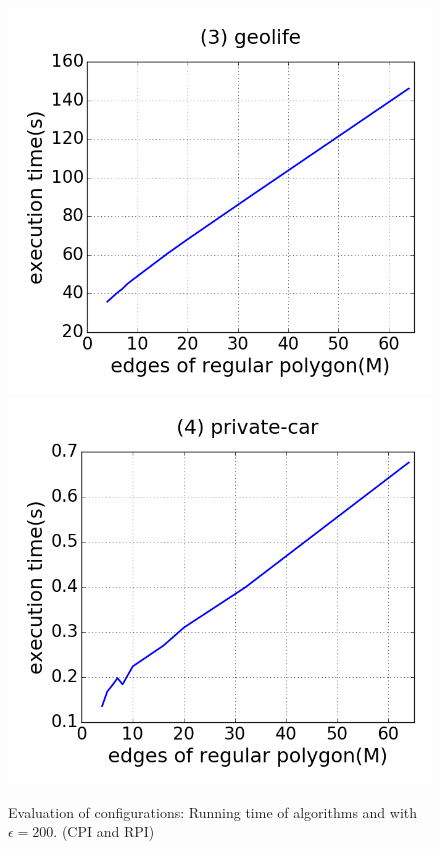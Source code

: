\begin{figure}[tb!]
\includegraphics[scale = 0.250]{figures/Exp-M-time-geolife.png}
\includegraphics[scale = 0.250]{figures/Exp-M-time-private.png}
\vspace{-2ex}
\caption{\small Evaluation of configurations: Running time of algorithms \cist and \cista with $\epsilon = 200$. (CPI and RPI)}
\label{fig:m-time-e200}
\vspace{-1ex}
\end{figure}



